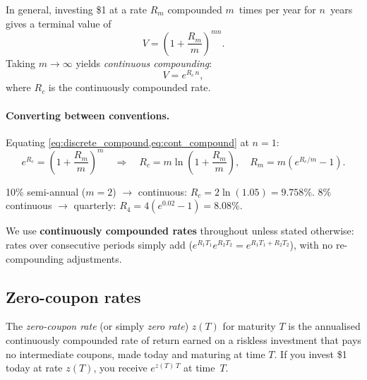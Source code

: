 In general, investing \$1 at a rate $R_m$ compounded $m$~times per
year for $n$~years gives a terminal value of
\begin{equation}
  V = \left(1 + \frac{R_m}{m}\right)^{mn}.
  \label{eq:discrete_compound}
\end{equation}
Taking $m \to \infty$ yields \emph{continuous compounding}:
\begin{equation}
  V = e^{R_c \, n},
  \label{eq:cont_compound}
\end{equation}
where $R_c$ is the continuously compounded rate.

\paragraph{Converting between conventions.}
Equating \cref{eq:discrete_compound,eq:cont_compound} at $n = 1$:
\begin{equation}
  e^{R_c} = \left(1 + \frac{R_m}{m}\right)^m
  \quad\Longrightarrow\quad
  R_c = m \ln\!\left(1 + \frac{R_m}{m}\right),
  \quad
  R_m = m\!\left(e^{R_c/m} - 1\right).
  \label{eq:rate_conversion}
\end{equation}

\begin{example}
10\% semi-annual ($m=2$) $\to$ continuous:
$R_c = 2\ln(1.05) = 9.758\%$.
8\% continuous $\to$ quarterly: $R_4 = 4(e^{0.02}-1) = 8.08\%$.
\end{example}

We use \textbf{continuously compounded rates} throughout unless stated
otherwise: rates over consecutive periods simply add
($e^{R_1 T_1} e^{R_2 T_2} = e^{R_1 T_1 + R_2 T_2}$), with no
re-compounding adjustments.

\subsection{Zero-coupon rates}

\begin{definition}
\label{def:zero_rate}
The \emph{zero-coupon rate} (or simply \emph{zero rate}) $z(T)$ for
maturity $T$ is the annualised continuously compounded rate of return
earned on a riskless investment that pays no intermediate coupons,
made today and maturing at time $T$.  If you invest \$1 today at rate
$z(T)$, you receive $e^{z(T)\,T}$ at time~$T$.
\end{definition}

